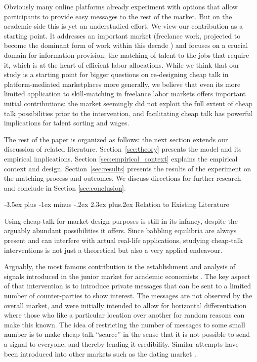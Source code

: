 \documentclass[12pt]{article}
\makeatletter
\renewcommand{\section}{%
  \@startsection{section}{1}{\z@}%
  {-3.5ex plus -1ex minus -.2ex}%
  {2.3ex plus.2ex}%
  {\normalfont\Large\bfseries}%
}
\makeatother
\begin{document}
Obviously many online platforms already experiment with options that allow participants to provide easy messages to the rest of the market. But on the academic side this is yet an understudied effort. We view our contribution as a starting point. It addresses an important market (freelance work, projected to become the dominant form of work within this decade \citep{Upwork2017}) and focuses on a crucial domain for information provision: the matching of talent to the jobs that require it, which is at the heart of efficient labor allocations. While we think that our study is a starting point for bigger questions on re-designing cheap talk in platform-mediated marketplaces more generally, we believe that even its more limited application to skill-matching in freelance labor markets offers important initial contributions: the market seemingly did not exploit the full extent of cheap talk possibilities prior to the intervention, and facilitating cheap talk has powerful implications for talent sorting and wages. 

The rest of the paper is organized as follows:
the next section extends our discussion of related literature. Section~\ref{sec:theory} presents the model and its empirical implications.
Section \ref{sec:empirical_context} explains the empirical context and design.
Section~\ref{sec:results} presents the results of the
experiment on the matching process and outcomes. 
We discuss directions for further research and conclude in Section \ref{sec:conclusion}.

\section{Relation to Existing Literature}\label{sec:literature}

Using cheap talk for market design purposes is still in its infancy, despite the arguably abundant possibilities it offers. Since babbling equilibria are always present and can interfere with actual real-life applications, studying cheap-talk interventions is not just a theoretical but also a very applied endeavour. 

Arguably, the most famous contribution is the establishment and analysis of signals introduced in the junior market for academic economists \citep{coles2013preference, kushnir2013harmful}. The key aspect of that intervention is to introduce private messages that can be sent to a limited number of counter-parties to show interest. The messages are not observed by the overall market, and were initially intended to allow for horizontal differentiation where those who like a particular location over another for random reasons can make this known. The idea of restricting the number of messages to some small number is to make cheap talk ``scarce'' in the sense that it is not possible to send a signal to everyone, and thereby lending it credibility. Similar attempts have been introduced into other markets such as the dating market \citep{lee2011propose}.
 
\end{document}

